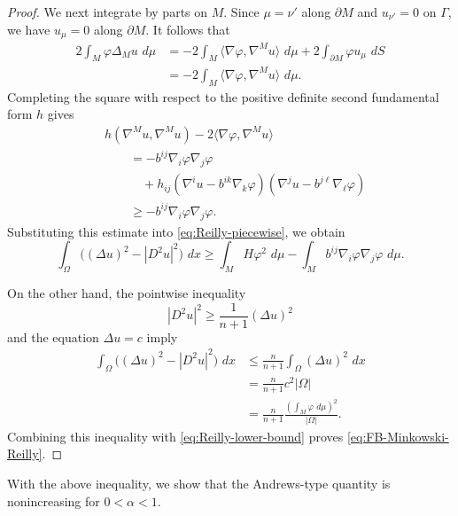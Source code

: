 \documentclass[11pt, reqno]{amsart}
\theoremstyle{remark}
\theoremstyle{definition}
\numberwithin{equation}{section}
\newcommand{\dd}{\,d}
\begin{document}
\begin{proof}
We next integrate by parts on $M$. Since $\mu=\nu'$ along
$\partial M$ and $u_{\nu'}=0$ on $\Gamma$, we have
$u_\mu=0$ along $\partial M$. It follows that
\begin{align*}
    2\int_M\varphi\Delta_Mu\,\dd\mu
    &=
    -2\int_M
    \langle\nabla\varphi,\nabla^Mu\rangle\,\dd\mu
    +
    2\int_{\partial M}\varphi u_\mu\,\dd S\\
    &=
    -2\int_M
    \langle\nabla\varphi,\nabla^Mu\rangle\,\dd\mu.
\end{align*}
Completing the square with respect to the positive definite
second fundamental form $h$ gives
\begin{align*}
    &h(\nabla^Mu,\nabla^Mu)
    -2\langle\nabla\varphi,\nabla^Mu\rangle\\
    &\qquad=
    -b^{ij}\nabla_i\varphi\nabla_j\varphi\\
    &\qquad\quad+
    h_{ij}
    \left(
        \nabla^iu-b^{ik}\nabla_k\varphi
    \right)
    \left(
        \nabla^ju-b^{j\ell}\nabla_\ell\varphi
    \right)\\
    &\qquad\geq
    -b^{ij}\nabla_i\varphi\nabla_j\varphi.
\end{align*}
Substituting this estimate into
\eqref{eq:Reilly-piecewise}, we obtain
\begin{equation}\label{eq:Reilly-lower-bound}
    \int_\Omega
    \big((\Delta u)^2-|D^2u|^2\big)\,\dd x
    \geq
    \int_MH\varphi^2\,\dd\mu
    -
    \int_M
    b^{ij}\nabla_i\varphi\nabla_j\varphi\,\dd\mu.
\end{equation}

On the other hand, the pointwise inequality
\begin{equation*}
    |D^2u|^2\geq\frac{1}{n+1}(\Delta u)^2
\end{equation*}
and the equation $\Delta u=c$ imply
\begin{align*}
    \int_\Omega
    \big((\Delta u)^2-|D^2u|^2\big)\,\dd x
    &\leq
    \frac{n}{n+1}
    \int_\Omega(\Delta u)^2\,\dd x\\
    &=
    \frac{n}{n+1}c^2|\Omega|\\
    &=
    \frac{n}{n+1}
    \frac{
        \left(\int_M\varphi\,\dd\mu\right)^2
    }{|\Omega|}.
\end{align*}
Combining this inequality with
\eqref{eq:Reilly-lower-bound} proves
\eqref{eq:FB-Minkowski-Reilly}.
\end{proof}


With the above inequality, we show that the Andrews-type quantity \cite[\S 4]{And00} is nonincreasing for $0<\alpha<1$.
\end{document}
